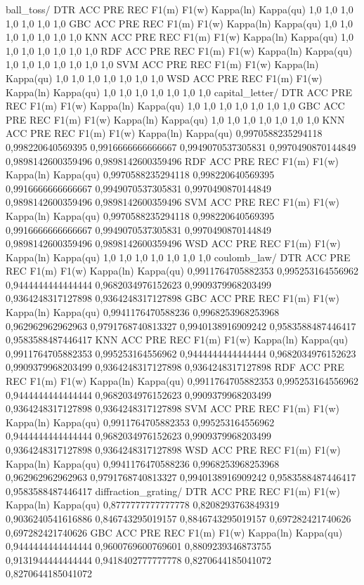 ball_toss/
DTR
ACC	PRE	REC	F1(m)	F1(w)	Kappa(ln)	Kappa(qu)
1,0	1,0	1,0	1,0	1,0	1,0	1,0
GBC
ACC	PRE	REC	F1(m)	F1(w)	Kappa(ln)	Kappa(qu)
1,0	1,0	1,0	1,0	1,0	1,0	1,0
KNN
ACC	PRE	REC	F1(m)	F1(w)	Kappa(ln)	Kappa(qu)
1,0	1,0	1,0	1,0	1,0	1,0	1,0
RDF
ACC	PRE	REC	F1(m)	F1(w)	Kappa(ln)	Kappa(qu)
1,0	1,0	1,0	1,0	1,0	1,0	1,0
SVM
ACC	PRE	REC	F1(m)	F1(w)	Kappa(ln)	Kappa(qu)
1,0	1,0	1,0	1,0	1,0	1,0	1,0
WSD
ACC	PRE	REC	F1(m)	F1(w)	Kappa(ln)	Kappa(qu)
1,0	1,0	1,0	1,0	1,0	1,0	1,0
capital_letter/
DTR
ACC	PRE	REC	F1(m)	F1(w)	Kappa(ln)	Kappa(qu)
1,0	1,0	1,0	1,0	1,0	1,0	1,0
GBC
ACC	PRE	REC	F1(m)	F1(w)	Kappa(ln)	Kappa(qu)
1,0	1,0	1,0	1,0	1,0	1,0	1,0
KNN
ACC	PRE	REC	F1(m)	F1(w)	Kappa(ln)	Kappa(qu)
0,9970588235294118	0,998220640569395	0,9916666666666667	0,9949070537305831	0,9970490870144849	0,9898142600359496	0,9898142600359496
RDF
ACC	PRE	REC	F1(m)	F1(w)	Kappa(ln)	Kappa(qu)
0,9970588235294118	0,998220640569395	0,9916666666666667	0,9949070537305831	0,9970490870144849	0,9898142600359496	0,9898142600359496
SVM
ACC	PRE	REC	F1(m)	F1(w)	Kappa(ln)	Kappa(qu)
0,9970588235294118	0,998220640569395	0,9916666666666667	0,9949070537305831	0,9970490870144849	0,9898142600359496	0,9898142600359496
WSD
ACC	PRE	REC	F1(m)	F1(w)	Kappa(ln)	Kappa(qu)
1,0	1,0	1,0	1,0	1,0	1,0	1,0
coulomb_law/
DTR
ACC	PRE	REC	F1(m)	F1(w)	Kappa(ln)	Kappa(qu)
0,9911764705882353	0,995253164556962	0,9444444444444444	0,9682034976152623	0,9909379968203499	0,9364248317127898	0,9364248317127898
GBC
ACC	PRE	REC	F1(m)	F1(w)	Kappa(ln)	Kappa(qu)
0,9941176470588236	0,9968253968253968	0,962962962962963	0,9791768740813327	0,9940138916909242	0,9583588487446417	0,9583588487446417
KNN
ACC	PRE	REC	F1(m)	F1(w)	Kappa(ln)	Kappa(qu)
0,9911764705882353	0,995253164556962	0,9444444444444444	0,9682034976152623	0,9909379968203499	0,9364248317127898	0,9364248317127898
RDF
ACC	PRE	REC	F1(m)	F1(w)	Kappa(ln)	Kappa(qu)
0,9911764705882353	0,995253164556962	0,9444444444444444	0,9682034976152623	0,9909379968203499	0,9364248317127898	0,9364248317127898
SVM
ACC	PRE	REC	F1(m)	F1(w)	Kappa(ln)	Kappa(qu)
0,9911764705882353	0,995253164556962	0,9444444444444444	0,9682034976152623	0,9909379968203499	0,9364248317127898	0,9364248317127898
WSD
ACC	PRE	REC	F1(m)	F1(w)	Kappa(ln)	Kappa(qu)
0,9941176470588236	0,9968253968253968	0,962962962962963	0,9791768740813327	0,9940138916909242	0,9583588487446417	0,9583588487446417
diffraction_grating/
DTR
ACC	PRE	REC	F1(m)	F1(w)	Kappa(ln)	Kappa(qu)
0,8777777777777778	0,8208293763849319	0,9036240541616886	0,846743295019157	0,8846743295019157	0,697282421740626	0,697282421740626
GBC
ACC	PRE	REC	F1(m)	F1(w)	Kappa(ln)	Kappa(qu)
0,9444444444444444	0,9600769600769601	0,8809239346873755	0,9131944444444444	0,9418402777777778	0,8270644185041072	0,8270644185041072
